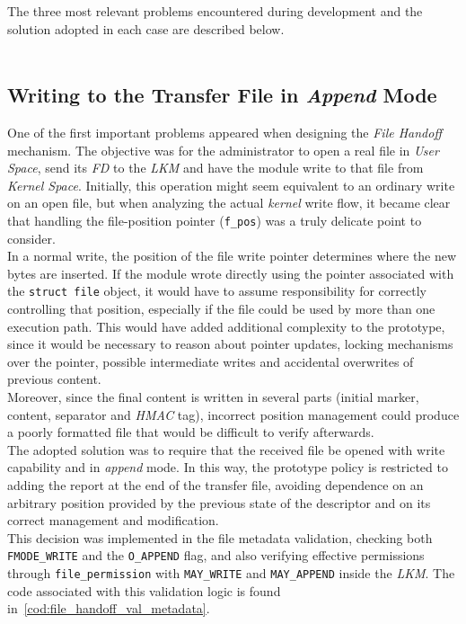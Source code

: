 The three most relevant problems encountered during development and the solution adopted in each case are described below.\\

\

\subsection{Writing to the Transfer File in \textit{Append} Mode}

One of the first important problems appeared when designing the \textit{File Handoff} mechanism.
The objective was for the administrator to open a real file in \textit{User Space}, send its \textit{FD} to the \textit{LKM} and have the module write to that file from \textit{Kernel Space}.
Initially, this operation might seem equivalent to an ordinary write on an open file, but when analyzing the actual \textit{kernel} write flow, it became clear that handling the file-position pointer (\verb|f_pos|) was a truly delicate point to consider.\\

In a normal write, the position of the file write pointer determines where the new bytes are inserted.
If the module wrote directly using the pointer associated with the \texttt{struct file} object, it would have to assume responsibility for correctly controlling that position, especially if the file could be used by more than one execution path.
This would have added additional complexity to the prototype, since it would be necessary to reason about pointer updates, locking mechanisms over the pointer, possible intermediate writes and accidental overwrites of previous content.\\

Moreover, since the final content is written in several parts (initial marker, content, separator and \textit{HMAC} tag), incorrect position management could produce a poorly formatted file that would be difficult to verify afterwards.\\

The adopted solution was to require that the received file be opened with write capability and in \textit{append} mode.
In this way, the prototype policy is restricted to adding the report at the end of the transfer file, avoiding dependence on an arbitrary position provided by the previous state of the descriptor and on its correct management and modification.\\

This decision was implemented in the file metadata validation, checking both \verb|FMODE_WRITE| and the \verb|O_APPEND| flag, and also verifying effective permissions through \verb|file_permission| with \verb|MAY_WRITE| and \verb|MAY_APPEND| inside the \textit{LKM}.
The code associated with this validation logic is found in~\ref{cod:file_handoff_val_metadata}.\\

